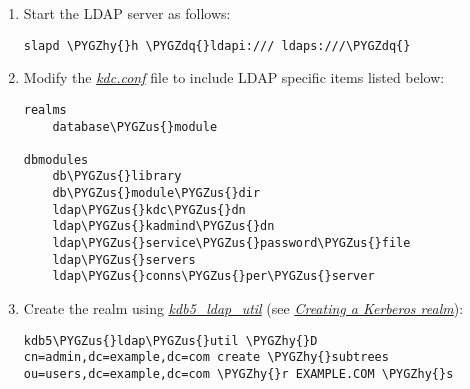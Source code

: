 \documentclass[letterpaper,10pt,english]{sphinxmanual}
\def\PYGZus{\char`\_}
\def\PYGZsh{\char`\#}
\def\PYGZhy{\char`\-}
\def\PYGZdq{\char`\"}
\begin{document}
\begin{enumerate}
\begin{Verbatim}[commandchars=\\\{\}]
\PYGZsh{} Providing access to realm container
access to dn.subtree= \PYGZdq{}cn=EXAMPLE.COM,cn=krbcontainer,dc=example,dc=com\PYGZdq{}
    by dn.exact=\PYGZdq{}cn=kdc\PYGZhy{}service,dc=example,dc=com\PYGZdq{} write
    by dn.exact=\PYGZdq{}cn=adm\PYGZhy{}service,dc=example,dc=com\PYGZdq{} write
    by * none

\PYGZsh{} Providing access to principals, if not underneath realm container
access to dn.subtree= \PYGZdq{}ou=users,dc=example,dc=com\PYGZdq{}
    by dn.exact=\PYGZdq{}cn=kdc\PYGZhy{}service,dc=example,dc=com\PYGZdq{} write
    by dn.exact=\PYGZdq{}cn=adm\PYGZhy{}service,dc=example,dc=com\PYGZdq{} write
    by * none

access to *
    by * read
\end{Verbatim}

If the locations of the container and principals or the DNs of
the service objects for a realm are changed then this
information should be updated.

\item {} 
Start the LDAP server as follows:

\begin{Verbatim}[commandchars=\\\{\}]
slapd \PYGZhy{}h \PYGZdq{}ldapi:/// ldaps:///\PYGZdq{}
\end{Verbatim}

\item {} 
Modify the {\hyperref[admin/conf_files/kdc_conf:kdc-conf-5]{\emph{kdc.conf}}} file to include LDAP specific items
listed below:

\begin{Verbatim}[commandchars=\\\{\}]
realms
    database\PYGZus{}module

dbmodules
    db\PYGZus{}library
    db\PYGZus{}module\PYGZus{}dir
    ldap\PYGZus{}kdc\PYGZus{}dn
    ldap\PYGZus{}kadmind\PYGZus{}dn
    ldap\PYGZus{}service\PYGZus{}password\PYGZus{}file
    ldap\PYGZus{}servers
    ldap\PYGZus{}conns\PYGZus{}per\PYGZus{}server
\end{Verbatim}

\item {} 
Create the realm using {\hyperref[admin/admin_commands/kdb5_ldap_util:kdb5-ldap-util-8]{\emph{kdb5\_ldap\_util}}} (see
{\hyperref[admin/database:ldap-create-realm]{\emph{Creating a Kerberos realm}}}):

\begin{Verbatim}[commandchars=\\\{\}]
kdb5\PYGZus{}ldap\PYGZus{}util \PYGZhy{}D cn=admin,dc=example,dc=com create \PYGZhy{}subtrees ou=users,dc=example,dc=com \PYGZhy{}r EXAMPLE.COM \PYGZhy{}s
\end{Verbatim}


\end{enumerate}
\end{document}

